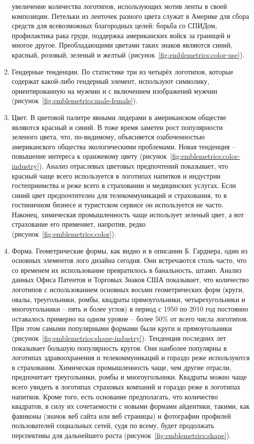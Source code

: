 \begin{enumerate}
  увеличение количества логотипов, использующих мотив ленты в своей композиции. Петельки из ленточек
  разного цвета служат в Америке для сбора средств для всевозможных благородных целей: борьба со
  СПИДом, профилактика рака груди, поддержка американских войск за границей и многое
  другое. Преобладающими цветами таких знаков являются синий, красный, розовый, зеленый и желтый
  (рисунок~\ref{fig:emblemetrics:color-use}).
\item Гендерные тенденции. По статистике три из четырёх логотипов, которые содержат какой-либо
  гендерный элемент, используют символику, ориентированную на мужчин и с включением изображений
  мужчин (рисунок~\ref{fig:emblemetrics:male-female}).
\item Цвет. В цветовой палитре явными лидерами в американском обществе являются красный и синий. В
  тоже время заметен рост популярности зеленого цвета, что, по-видимому, объясняется  озабоченностью
  американского общества экологическими проблемами. Новая тенденция -- повышение интереса к
  оранжевому цвету (рисунок~\ref{fig:emblemetrics:color-industry}). Анализ отраслевых цветовых
  предпочтений показывает, что красный чаще всего используется в логотипах напитков и индустрии
  гостеприимства и реже всего в страховании и медицинских услугах. Если  синий цвет предпочтителен
  для  телекоммуникаций и страхования, то в гостиничном бизнесе и туристском сервисе он используется
  не часто. Наконец, химическая промышленность чаще использует зеленый цвет, а вот страхование его
  применяет, напротив, редко (рисунок~\ref{fig:emblemetrics:color}).
\item Форма. Геометрические формы, как видно и в описании Б. Гарднера, один из основных элементов
  лого дизайна сегодня. Они встречаются столь часто, что со временем их использование превратилось в
  банальность, штамп. Анализ данных Офиса Патентов и Торговых Знаков США показывает, что  количество
  логотипов с использованием основных восьми геометрических форм (круги, овалы, треугольники, ромбы,
  квадраты прямоугольники, четырехугольники и многоугольники -- пять и более  углов)  в период с
  1950 по 2010 год постоянно оставалось примерно на одном уровне -- более 50\% от всего числа
  логотипов. При этом самыми популярными формами были круги и прямоугольники
  (рисунок~\ref{fig:emblemetrics:shape-industry}). Тенденция последних лет показывает большую
  популярность кругов. Они наиболее популярны в логотипах здравоохранения и телекоммуникаций и
  гораздо реже используются в страховании. Химическая промышленность чаще, чем другие отрасли,
  предпочитает треугольники, ромбы и многоугольники. Квадраты можно чаще всего увидеть в логотипах
  страховых компаний и гораздо реже в логотипах напитков. Кроме того, есть основание предполагать,
  что количество квадратов, в силу их сочетаемости  с новыми формами айдентики, такими, как фавиконы
  (значок веб сайта или веб страницы) и фотографии профилей пользователей социальных сетей, судя по
  всему, будет продолжать  перспективы  для дальнейшего роста (рисунок~\ref{fig:emblemetrics:shape}).
\end{enumerate}

